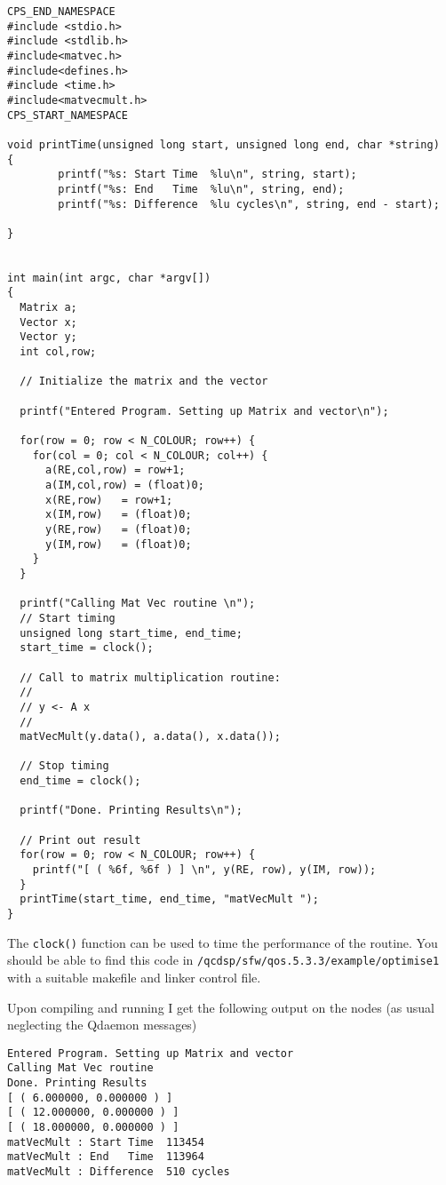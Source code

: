 {\scriptsize
\begin{verbatim}
CPS_END_NAMESPACE
#include <stdio.h>
#include <stdlib.h>
#include<matvec.h>
#include<defines.h>
#include <time.h>
#include<matvecmult.h>
CPS_START_NAMESPACE

void printTime(unsigned long start, unsigned long end, char *string)
{
        printf("%s: Start Time  %lu\n", string, start);
        printf("%s: End   Time  %lu\n", string, end);
        printf("%s: Difference  %lu cycles\n", string, end - start);

} 
  
   
int main(int argc, char *argv[]) 
{
  Matrix a;
  Vector x;
  Vector y; 
  int col,row;

  // Initialize the matrix and the vector 

  printf("Entered Program. Setting up Matrix and vector\n");

  for(row = 0; row < N_COLOUR; row++) {
    for(col = 0; col < N_COLOUR; col++) {
      a(RE,col,row) = row+1;
      a(IM,col,row) = (float)0;
      x(RE,row)   = row+1;
      x(IM,row)   = (float)0;
      y(RE,row)   = (float)0;
      y(IM,row)   = (float)0;
    }
  }

  printf("Calling Mat Vec routine \n");
  // Start timing
  unsigned long start_time, end_time;
  start_time = clock();

  // Call to matrix multiplication routine:
  // 
  // y <- A x 
  // 
  matVecMult(y.data(), a.data(), x.data());

  // Stop timing
  end_time = clock();
  
  printf("Done. Printing Results\n");

  // Print out result 
  for(row = 0; row < N_COLOUR; row++) {
    printf("[ ( %6f, %6f ) ] \n", y(RE, row), y(IM, row));
  }
  printTime(start_time, end_time, "matVecMult ");
}
\end{verbatim}}

The {\tt clock()} function can be used to time the performance of the 
routine. You should be able to find this code in {\tt /qcdsp/sfw/qos.5.3.3/example/optimise1} with a suitable makefile and linker control file.

Upon compiling and running I get the following output on the nodes
(as usual neglecting the Qdaemon messages)

\begin{verbatim}
Entered Program. Setting up Matrix and vector
Calling Mat Vec routine 
Done. Printing Results
[ ( 6.000000, 0.000000 ) ] 
[ ( 12.000000, 0.000000 ) ] 
[ ( 18.000000, 0.000000 ) ] 
matVecMult : Start Time  113454
matVecMult : End   Time  113964
matVecMult : Difference  510 cycles
\end{verbatim}

